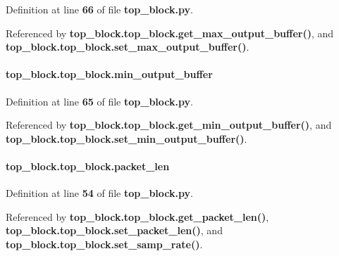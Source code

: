 Definition at line {\bf 66} of file {\bf top\+\_\+block.\+py}.



Referenced by {\bf top\+\_\+block.\+top\+\_\+block.\+get\+\_\+max\+\_\+output\+\_\+buffer()}, and {\bf top\+\_\+block.\+top\+\_\+block.\+set\+\_\+max\+\_\+output\+\_\+buffer()}.

\paragraph[{min\+\_\+output\+\_\+buffer}]{\setlength{\rightskip}{0pt plus 5cm}top\+\_\+block.\+top\+\_\+block.\+min\+\_\+output\+\_\+buffer}\label{classtop__block_1_1top__block_af5a3e3d1dcbe0afc6796547ecd931de7}


Definition at line {\bf 65} of file {\bf top\+\_\+block.\+py}.



Referenced by {\bf top\+\_\+block.\+top\+\_\+block.\+get\+\_\+min\+\_\+output\+\_\+buffer()}, and {\bf top\+\_\+block.\+top\+\_\+block.\+set\+\_\+min\+\_\+output\+\_\+buffer()}.

\paragraph[{packet\+\_\+len}]{\setlength{\rightskip}{0pt plus 5cm}top\+\_\+block.\+top\+\_\+block.\+packet\+\_\+len}\label{classtop__block_1_1top__block_a8c40f1fd7433d6a4528c83ba25b58f52}


Definition at line {\bf 54} of file {\bf top\+\_\+block.\+py}.



Referenced by {\bf top\+\_\+block.\+top\+\_\+block.\+get\+\_\+packet\+\_\+len()}, {\bf top\+\_\+block.\+top\+\_\+block.\+set\+\_\+packet\+\_\+len()}, and {\bf top\+\_\+block.\+top\+\_\+block.\+set\+\_\+samp\+\_\+rate()}.

